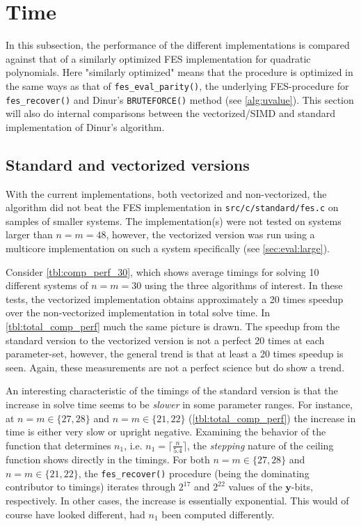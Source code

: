\section{Time} \label{sec:eval:dinur_fes}
In this subsection, the performance of the different implementations is compared against that of a similarly optimized FES implementation for quadratic polynomials. Here "similarly optimized" means that the procedure is optimized in the same ways as that of \texttt{fes\_eval\_parity()}, the underlying FES-procedure for \texttt{fes\_recover()} and Dinur's \texttt{BRUTEFORCE()} method (see \cref{alg:uvalue}). This section will also do internal comparisons between the vectorized/SIMD and standard implementation of Dinur's algorithm. 

\subsection{Standard and vectorized versions}
With the current implementations, both vectorized and non-vectorized, the algorithm did not beat the FES implementation in \texttt{src/c/standard/fes.c} on samples of smaller systems. The implementation(s) were not tested on systems larger than $n = m = 48$, however, the vectorized version was run using a multicore implementation on such a system specifically (see \cref{sec:eval:large}).

Consider \cref{tbl:comp_perf_30}, which shows average timings for solving 10 different systems of $n = m = 30$ using the three algorithms of interest. In these tests, the vectorized implementation obtains approximately a 20 times speedup over the non-vectorized implementation in total solve time. In \cref{tbl:total_comp_perf} much the same picture is drawn. The speedup from the standard version to the vectorized version is not a perfect 20 times at each parameter-set, however, the general trend is that at least a 20 times speedup is seen. Again, these measurements are not a perfect science but do show a trend. 

An interesting characteristic of the timings of the standard version is that the increase in solve time seems to be \textit{slower} in some parameter ranges. For instance, at $n = m \in \{27, 28\}$ and $n = m \in \{21,22\}$ (\cref{tbl:total_comp_perf}) the increase in time is either very slow or upright negative. Examining the behavior of the function that determines $n_1$, i.e. $n_1 = \lceil \frac{n}{5.4} \rceil$, the \textit{stepping} nature of the ceiling function shows directly in the timings. For both $n = m \in \{27, 28\}$ and $n = m \in \{21,22\}$, the \texttt{fes\_recover()} procedure (being the dominating contributor to timings) iterates through $2^{17}$ and $2^{22}$ values of the $\mathbf{y}$-bits, respectively. In other cases, the increase is essentially exponential. This would of course have looked different, had $n_1$ been computed differently.

